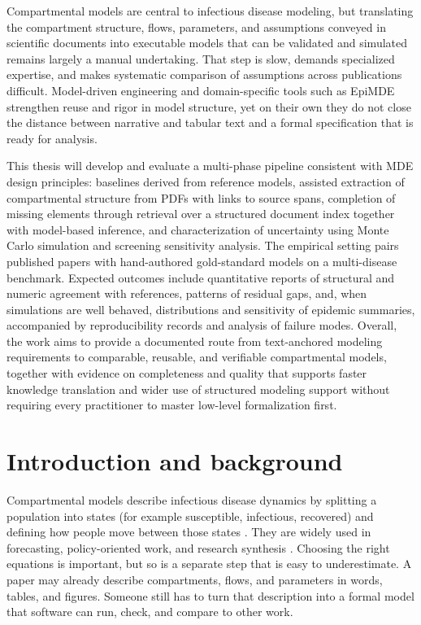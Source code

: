 \documentclass[a4paper,12pt]{article}
\begin{document}
Compartmental models are central to infectious disease modeling, but translating the compartment structure, flows, parameters, and assumptions conveyed in scientific documents into executable models that can be validated and simulated remains largely a manual undertaking. That step is slow, demands specialized expertise, and makes systematic comparison of assumptions across publications difficult. Model-driven engineering and domain-specific tools such as EpiMDE strengthen reuse and rigor in model structure, yet on their own they do not close the distance between narrative and tabular text and a formal specification that is ready for analysis.

This thesis will develop and evaluate a multi-phase pipeline consistent with MDE design principles: baselines derived from reference models, assisted extraction of compartmental structure from PDFs with links to source spans, completion of missing elements through retrieval over a structured document index together with model-based inference, and characterization of uncertainty using Monte Carlo simulation and screening sensitivity analysis. The empirical setting pairs published papers with hand-authored gold-standard models on a multi-disease benchmark. Expected outcomes include quantitative reports of structural and numeric agreement with references, patterns of residual gaps, and, when simulations are well behaved, distributions and sensitivity of epidemic summaries, accompanied by reproducibility records and analysis of failure modes. Overall, the work aims to provide a documented route from text-anchored modeling requirements to comparable, reusable, and verifiable compartmental models, together with evidence on completeness and quality that supports faster knowledge translation and wider use of structured modeling support without requiring every practitioner to master low-level formalization first.

\section{Introduction and background}

Compartmental models describe infectious disease dynamics by splitting a population into states (for example susceptible, infectious, recovered) and defining how people move between those states \citep{keeling2008modeling}. They are widely used in forecasting, policy-oriented work, and research synthesis \citep{TuiteE497}. Choosing the right equations is important, but so is a separate step that is easy to underestimate. A paper may already describe compartments, flows, and parameters in words, tables, and figures. Someone still has to turn that description into a formal model that software can run, check, and compare to other work.
\end{document}
